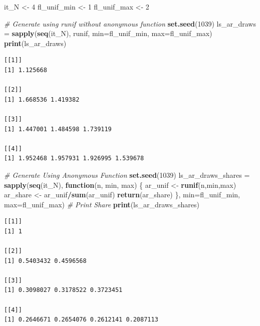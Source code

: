 \documentclass[
]{book}
\newenvironment{Shaded}{\begin{snugshade}}{\end{snugshade}}
\newcommand{\CommentTok}[1]{\textcolor[rgb]{0.56,0.35,0.01}{\textit{#1}}}
\newcommand{\ControlFlowTok}[1]{\textcolor[rgb]{0.13,0.29,0.53}{\textbf{#1}}}
\newcommand{\DataTypeTok}[1]{\textcolor[rgb]{0.13,0.29,0.53}{#1}}
\newcommand{\DecValTok}[1]{\textcolor[rgb]{0.00,0.00,0.81}{#1}}
\newcommand{\KeywordTok}[1]{\textcolor[rgb]{0.13,0.29,0.53}{\textbf{#1}}}
\newcommand{\NormalTok}[1]{#1}
\newcommand{\OperatorTok}[1]{\textcolor[rgb]{0.81,0.36,0.00}{\textbf{#1}}}
\newcommand{\StringTok}[1]{\textcolor[rgb]{0.31,0.60,0.02}{#1}}
\begin{document}
\begin{Shaded}
\begin{Highlighting}[]
\NormalTok{it_N <-}\StringTok{ }\DecValTok{4}
\NormalTok{fl_unif_min <-}\StringTok{ }\DecValTok{1}
\NormalTok{fl_unif_max <-}\StringTok{ }\DecValTok{2}

\CommentTok{# Generate using runif without anonymous function}
\KeywordTok{set.seed}\NormalTok{(}\DecValTok{1039}\NormalTok{)}
\NormalTok{ls_ar_draws =}\StringTok{ }\KeywordTok{sapply}\NormalTok{(}\KeywordTok{seq}\NormalTok{(it_N),}
\NormalTok{                     runif,}
                     \DataTypeTok{min=}\NormalTok{fl_unif_min, }\DataTypeTok{max=}\NormalTok{fl_unif_max)}
\KeywordTok{print}\NormalTok{(ls_ar_draws)}
\end{Highlighting}
\end{Shaded}

\begin{verbatim}
[[1]]
[1] 1.125668

[[2]]
[1] 1.668536 1.419382

[[3]]
[1] 1.447001 1.484598 1.739119

[[4]]
[1] 1.952468 1.957931 1.926995 1.539678
\end{verbatim}

\begin{Shaded}
\begin{Highlighting}[]
\CommentTok{# Generate Using Anonymous Function}
\KeywordTok{set.seed}\NormalTok{(}\DecValTok{1039}\NormalTok{)}
\NormalTok{ls_ar_draws_shares =}\StringTok{ }\KeywordTok{sapply}\NormalTok{(}\KeywordTok{seq}\NormalTok{(it_N),}
                            \ControlFlowTok{function}\NormalTok{(n, min, max) \{}
\NormalTok{                              ar_unif <-}\StringTok{ }\KeywordTok{runif}\NormalTok{(n,min,max)}
\NormalTok{                              ar_share <-}\StringTok{ }\NormalTok{ar_unif}\OperatorTok{/}\KeywordTok{sum}\NormalTok{(ar_unif)}
                              \KeywordTok{return}\NormalTok{(ar_share)}
\NormalTok{                            \},}
                            \DataTypeTok{min=}\NormalTok{fl_unif_min, }\DataTypeTok{max=}\NormalTok{fl_unif_max)}
\CommentTok{# Print Share}
\KeywordTok{print}\NormalTok{(ls_ar_draws_shares)}
\end{Highlighting}
\end{Shaded}

\begin{verbatim}
[[1]]
[1] 1

[[2]]
[1] 0.5403432 0.4596568

[[3]]
[1] 0.3098027 0.3178522 0.3723451

[[4]]
[1] 0.2646671 0.2654076 0.2612141 0.2087113
\end{verbatim}
\end{document}

